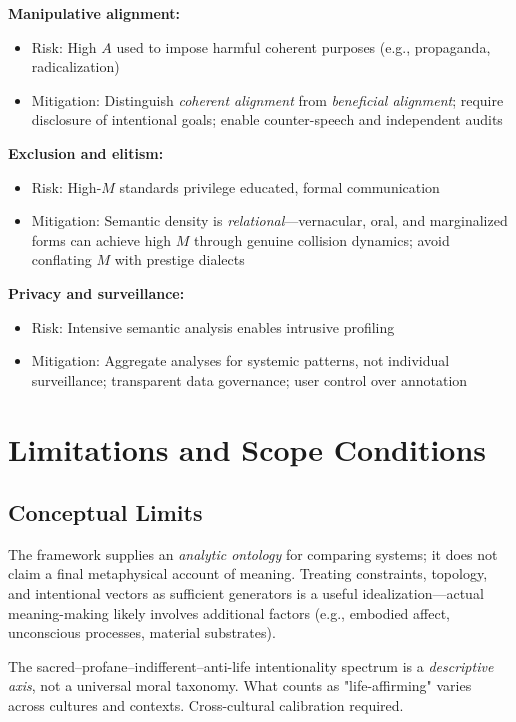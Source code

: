 \documentclass[12pt]{article}
\begin{document}
\textbf{Manipulative alignment:}
\begin{itemize}
\item Risk: High $A$ used to impose harmful coherent purposes (e.g., propaganda, radicalization)
\item Mitigation: Distinguish \textit{coherent alignment} from \textit{beneficial alignment}; require disclosure of intentional goals; enable counter-speech and independent audits
\end{itemize}

\textbf{Exclusion and elitism:}
\begin{itemize}
\item Risk: High-$M$ standards privilege educated, formal communication
\item Mitigation: Semantic density is \textit{relational}—vernacular, oral, and marginalized forms can achieve high $M$ through genuine collision dynamics; avoid conflating $M$ with prestige dialects
\end{itemize}

\textbf{Privacy and surveillance:}
\begin{itemize}
\item Risk: Intensive semantic analysis enables intrusive profiling
\item Mitigation: Aggregate analyses for systemic patterns, not individual surveillance; transparent data governance; user control over annotation
\end{itemize}

\section{Limitations and Scope Conditions}
\label{sec:limitations}

\subsection{Conceptual Limits}

The framework supplies an \textit{analytic ontology} for comparing systems; it does not claim a final metaphysical account of meaning. Treating constraints, topology, and intentional vectors as sufficient generators is a useful idealization—actual meaning-making likely involves additional factors (e.g., embodied affect, unconscious processes, material substrates).

The sacred–profane–indifferent–anti-life intentionality spectrum is a \textit{descriptive axis}, not a universal moral taxonomy. What counts as "life-affirming" varies across cultures and contexts. Cross-cultural calibration required.
\end{document}
